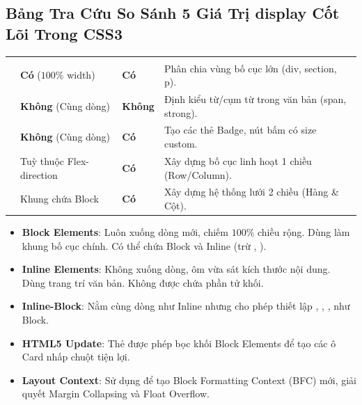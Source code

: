 \Needspace*{80pt}
\subsection{Bảng Tra Cứu So Sánh 5 Giá Trị display Cốt Lõi Trong CSS3}

\begin{prettyTableBox}
\begin{tabularx}{\linewidth}{K{2.2cm} Z Z Z}
 &  &  &  \\
 & \textbf{Có} ($100\%$ width) & \textbf{Có} & Phân chia vùng bố cục lớn (div, section, p). \\
 & \textbf{Không} (Cùng dòng) & \textbf{Không} & Định kiểu từ/cụm từ trong văn bản (span, strong). \\
 & \textbf{Không} (Cùng dòng) & \textbf{Có} & Tạo các thẻ Badge, nút bấm có size custom. \\
 & Tuỳ thuộc Flex-direction & \textbf{Có} & Xây dựng bố cục linh hoạt 1 chiều (Row/Column). \\
 & Khung chứa Block & \textbf{Có} & Xây dựng hệ thống lưới 2 chiều (Hàng \& Cột). \\
\end{tabularx}
\end{prettyTableBox}

\begin{conceptBox}
\begin{itemize}[leftmargin=1.5em, itemsep=3pt, parsep=0pt]
    \item \textbf{Block Elements}: Luôn xuống dòng mới, chiếm $100\%$ chiều rộng. Dùng làm khung bố cục chính. Có thể chứa Block và Inline (trừ , ).
    \item \textbf{Inline Elements}: Không xuống dòng, ôm vừa sát kích thước nội dung. Dùng trang trí văn bản. Không được chứa phần tử khối.
    \item \textbf{Inline-Block}: Nằm cùng dòng như Inline nhưng cho phép thiết lập , , ,  như Block.
    \item \textbf{HTML5 Update}: Thẻ  được phép bọc khối Block Elements để tạo các ô Card nhấp chuột tiện lợi.
    \item \textbf{Layout Context}: Sử dụng  để tạo Block Formatting Context (BFC) mới, giải quyết Margin Collapsing và Float Overflow.
\end{itemize}
\end{conceptBox}

